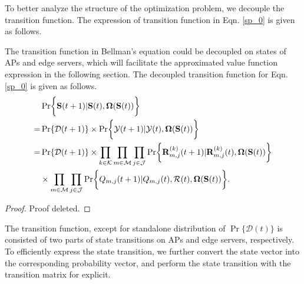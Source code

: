 To better analyze the structure of the optimization problem, we decouple the transition function.
The expression of transition function in Eqn. \ref{sp_0} is given as follows.
\begin{lemma}
    The transition function in Bellman's equation could be decoupled on states of APs and edge servers, which will facilitate the approximated value function expression in the following section.
    The decoupled transition function for Eqn. \ref{sp_0} is given as follows.
    \begin{align}
        & \Pr\Brace{ \Stat({t+1})|\Stat({t}), \Policy(\Stat({t})) }
        \nonumber\\
        =& \Pr\{\mathcal{D}({t+1})\} \times \Pr\Brace{ \Obsv({t+1})|\Obsv({t}), \Policy(\Stat({t}))}
        \nonumber\\
        =& \Pr\{\mathcal{D}({t+1})\} \times \prod_{k\in\apSet}\prod_{m\in\esSet}\prod_{j\in\jSpace}
                \Pr\Brace{
                    \vec{R}^{(k)}_{m,j}({t+1}) | \vec{R}^{(k)}_{m,j}({t}),
                    \Policy(\Stat({t}))
                }  
            \nonumber\\
            & \times \prod_{m\in\esSet}\prod_{j\in\jSpace}
                \Pr\Brace{
                    Q_{m,j}({t+1})|Q_{m,j}({t}), \mathcal{R}({t}), \Policy(\Stat({t}))
                }.
    \end{align}
\end{lemma}
\begin{proof}
    Proof deleted.
\end{proof}

The transition function, except for standalone distribution of $\Pr\{\mathcal{D}({t})\}$ is consisted of two parts of state transitions on APs and edge servers, respectively.
To efficiently express the state transition, we further convert the state vector into the corresponding probability vector, and perform the state transition with the transition matrix for explicit.

